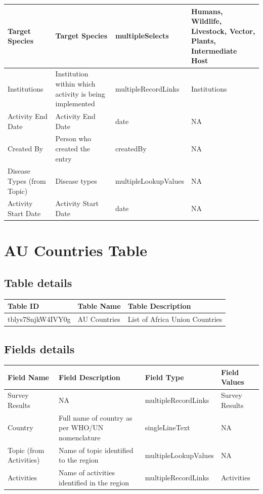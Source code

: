 \documentclass[
]{book}
\begin{document}
\begin{table}
\begin{tabular}{l|l|l|l}
\hline
Target Species & Target Species & multipleSelects & Humans, Wildlife, Livestock, Vector, Plants, Intermediate Host\\
\hline
Institutions & Institution within which activity is being implemented & multipleRecordLinks & Institutions\\
\hline
Activity End Date & Activity End Date & date & NA\\
\hline
Created By & Person who created the entry & createdBy & NA\\
\hline
Disease Types (from Topic) & Disease types & multipleLookupValues & NA\\
\hline
Activity Start Date & Activity Start Date & date & NA\\
\hline
\end{tabular}
\end{table}

\hypertarget{au-countries-table}{%
\section{AU Countries Table}\label{au-countries-table}}

\hypertarget{table-details-1}{%
\subsection{Table details}\label{table-details-1}}

\begin{table}
\centering
\begin{tabular}{l|l|l}
\hline
\textbf{Table ID} & \textbf{Table Name} & \textbf{Table Description}\\
\hline
tblys7SnjkW4IVY0g & AU Countries & List of Africa Union Countries\\
\hline
\end{tabular}
\end{table}

\hypertarget{fields-details-1}{%
\subsection{Fields details}\label{fields-details-1}}

\begin{table}
\centering
\begin{tabular}{l|l|l|l}
\hline
\textbf{Field Name} & \textbf{Field Description} & \textbf{Field Type} & \textbf{Field Values}\\
\hline
Survey Results & NA & multipleRecordLinks & Survey Results\\
\hline
Country & Full name of country as per WHO/UN nomenclature & singleLineText & NA\\
\hline
Topic (from Activities) & Name of topic identified to the region & multipleLookupValues & NA\\
\hline
Activities & Name of activities identified in the region & multipleRecordLinks & Activities\\
\hline
\end{tabular}
\end{table}
\end{document}
